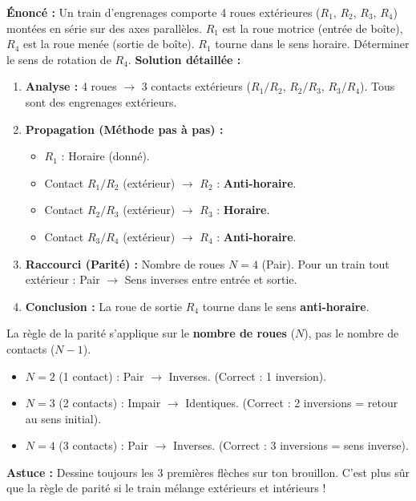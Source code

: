 \documentclass[11pt]{article}
\begin{document}
\begin{exoresolu}
\textbf{Énoncé :} Un train d'engrenages comporte 4 roues extérieures ($R_1$, $R_2$, $R_3$, $R_4$) montées en série sur des axes parallèles. $R_1$ est la roue motrice (entrée de boîte), $R_4$ est la roue menée (sortie de boîte). $R_1$ tourne dans le sens horaire. Déterminer le sens de rotation de $R_4$.
\textbf{Solution détaillée :}
\begin{enumerate}
\item \textbf{Analyse :} 4 roues $\rightarrow$ 3 contacts extérieurs ($R_1/R_2$, $R_2/R_3$, $R_3/R_4$). Tous sont des engrenages extérieurs.
\item \textbf{Propagation (Méthode pas à pas) :}
  \begin{itemize}
  \item $R_1$ : Horaire (donné).
  \item Contact $R_1/R_2$ (extérieur) $\rightarrow$ $R_2$ : \textbf{Anti-horaire}.
  \item Contact $R_2/R_3$ (extérieur) $\rightarrow$ $R_3$ : \textbf{Horaire}.
  \item Contact $R_3/R_4$ (extérieur) $\rightarrow$ $R_4$ : \textbf{Anti-horaire}.
  \end{itemize}
\item \textbf{Raccourci (Parité) :} Nombre de roues $N = 4$ (Pair). Pour un train tout extérieur : Pair $\rightarrow$ Sens inverses entre entrée et sortie.
\item \textbf{Conclusion :} La roue de sortie $R_4$ tourne dans le sens \textbf{anti-horaire}.
\end{enumerate}
\end{exoresolu}

\begin{attention}
La règle de la parité s'applique sur le \textbf{nombre de roues} ($N$), pas le nombre de contacts ($N-1$).
\begin{itemize}
\item $N=2$ (1 contact) : Pair $\rightarrow$ Inverses. (Correct : 1 inversion).
\item $N=3$ (2 contacts) : Impair $\rightarrow$ Identiques. (Correct : 2 inversions = retour au sens initial).
\item $N=4$ (3 contacts) : Pair $\rightarrow$ Inverses. (Correct : 3 inversions = sens inverse).
\end{itemize}
\textbf{Astuce :} Dessine toujours les 3 premières flèches sur ton brouillon. C'est plus sûr que la règle de parité si le train mélange extérieurs et intérieurs !
\end{attention}
\end{document}
